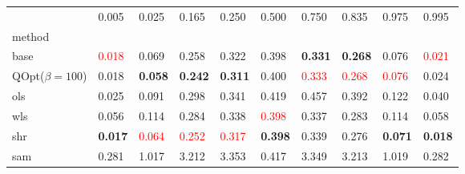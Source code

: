 \begin{tabular}{llllllllll}
\toprule
 & 0.005 & 0.025 & 0.165 & 0.250 & 0.500 & 0.750 & 0.835 & 0.975 & 0.995 \\
method &  &  &  &  &  &  &  &  &  \\
\midrule
base & \textcolor{red}{0.018} & 0.069 & 0.258 & 0.322 & 0.398 & \textbf{0.331} & \textbf{0.268} & 0.076 & \textcolor{red}{0.021} \\
\midrule
QOpt($\beta=100$) & 0.018 & \textbf{0.058} & \textbf{0.242} & \textbf{0.311} & 0.400 & \textcolor{red}{0.333} & \textcolor{red}{0.268} & \textcolor{red}{0.076} & 0.024 \\
ols & 0.025 & 0.091 & 0.298 & 0.341 & 0.419 & 0.457 & 0.392 & 0.122 & 0.040 \\
wls & 0.056 & 0.114 & 0.284 & 0.338 & \textcolor{red}{0.398} & 0.337 & 0.283 & 0.114 & 0.058 \\
shr & \textbf{0.017} & \textcolor{red}{0.064} & \textcolor{red}{0.252} & \textcolor{red}{0.317} & \textbf{0.398} & 0.339 & 0.276 & \textbf{0.071} & \textbf{0.018} \\
sam & 0.281 & 1.017 & 3.212 & 3.353 & 0.417 & 3.349 & 3.213 & 1.019 & 0.282 \\
\bottomrule
\end{tabular}